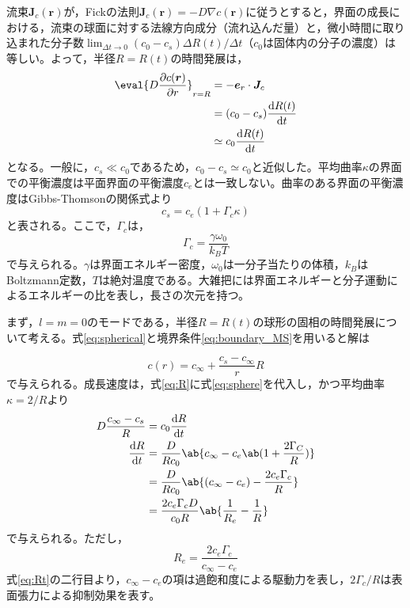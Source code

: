 \documentclass[autodetect-engine,dvi=dvipdfmx,a4paper,ja=standard,oneside,openany,11pt]{bxjsbook}
\begin{document}
流束$\bm{J}_c(\bm{r})$が，Fickの法則$\bm{J}_c(\bm{r})=-D\nabla c(\bm{r})$に従うとすると，界面の成長における，流束の球面に対する法線方向成分（流れ込んだ量）と，微小時間に取り込まれた分子数$\lim_{\Delta t\to 0} (c_0-c_s)\Delta R(t)/\Delta t$（$c_0$は固体内の分子の濃度）は等しい。よって，半径$R=R(t)$の時間発展は，
\begin{equation}
  \begin{split}
    \eval{D\pdv{c(\bm{r})}{r}}_{r=R} & = -\bm{e}_r\cdot\bm{J}_c \\
                                     & = (c_0-c_s)\odv{R(t)}{t} \\
                                     & \simeq c_0\odv{R(t)}{t}
  \end{split}
  \label{eq:R}
\end{equation}
となる。一般に，$c_s\ll c_0$であるため，$c_0-c_s\simeq c_0$と近似した。平均曲率$\kappa$の界面での平衡濃度は平面界面の平衡濃度$c_e$とは一致しない。曲率のある界面の平衡濃度はGibbs-Thomsonの関係式より
\begin{equation}
  c_s = c_e(1+\Gamma_c \kappa)
  \label{eq:Gibbs-Thomson}
\end{equation}
と表される。ここで，$\Gamma_c$は，
\begin{equation}
  \Gamma_c = \frac{\gamma \omega_0}{k_BT}
\end{equation}
で与えられる。$\gamma$は界面エネルギー密度，$\omega_0$は一分子当たりの体積，$k_B$はBoltzmann定数，$T$は絶対温度である。大雑把には界面エネルギーと分子運動によるエネルギーの比を表し，長さの次元を持つ。

まず，$l=m=0$のモードである，半径$R=R(t)$の球形の固相の時間発展について考える。式\eqref{eq:spherical}と境界条件\eqref{eq:boundary_MS}を用いると解は

\begin{equation}
  c(r) = c_{\infty} + \frac{c_s-c_{\infty}}{r}R
  \label{eq:sphere}
\end{equation}
で与えられる。成長速度は，式\eqref{eq:R}に式\eqref{eq:sphere}を代入し，かつ平均曲率$\kappa=2/R$より
\begin{equation}
  \begin{split}
    D\frac{c_\infty-c_s}{R} & =c_0\odv{R}{t}                                                 \\
    \odv{R}{t}              & = \frac{D}{Rc_0}\ab\{c_\infty-c_e\ab(1+\frac{2\Gamma_C}{R})\}  \\
                            & = \frac{D}{R c_0}\ab\{(c_\infty-c_e)-\frac{2c_e\Gamma_c}{R}\}  \\
                            & = \frac{2c_e\Gamma_c D}{c_0 R}\ab\{\frac{1}{R_e}-\frac{1}{R}\}
  \end{split}
  \label{eq:Rt}
\end{equation}
で与えられる。ただし，
\begin{equation}
  R_e = \frac{2c_e \Gamma_c }{c_\infty-c_e}
  \label{eq:Re}
\end{equation}
式\eqref{eq:Rt}の二行目より，$c_\infty-c_e$の項は過飽和度による駆動力を表し，$2\Gamma_c/R$は表面張力による抑制効果を表す。
\end{document}
